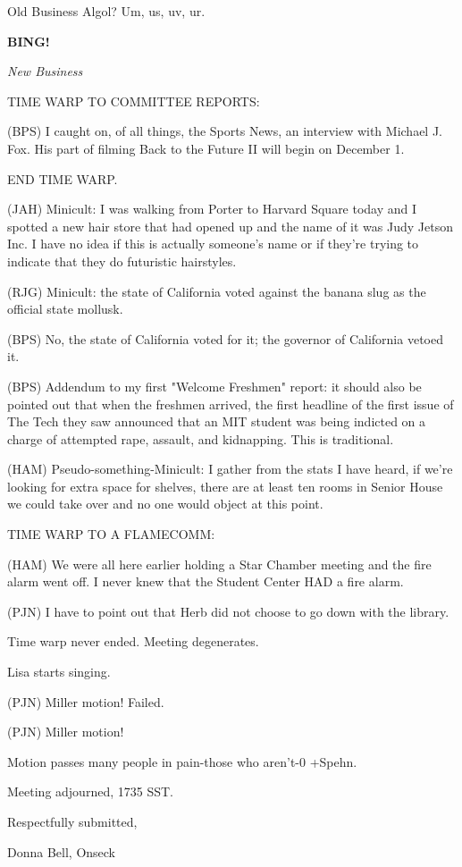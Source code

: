 \documentclass[12pt]{article}
\newcommand{\bing}{{\bf BING!} }
\newcommand{\goto}[1]{\bing \vskip 12pt \centerline{{\em{#1}}}}
\begin{document}
Old Business Algol? Um, us, uv, ur.

\goto{New Business}

TIME WARP TO COMMITTEE REPORTS:

(BPS) I caught on, of all things, the Sports News, an interview with Michael J. Fox. His part of filming Back to the Future II will begin on December 1.

END TIME WARP.

(JAH) Minicult: I was walking from Porter to Harvard Square today and I spotted a new hair store that had opened up and the name of it was Judy Jetson Inc. I have no idea if this is actually someone's name or if they're trying to indicate that they do futuristic hairstyles.

(RJG) Minicult: the state of California voted against the banana slug as the official state mollusk.

(BPS) No, the state of California voted for it; the governor of California vetoed it.

(BPS) Addendum to my first "Welcome Freshmen" report: it should also be pointed out that when the freshmen arrived, the first headline of the first issue of The Tech they saw announced that an MIT student was being indicted on a charge of attempted rape, assault, and kidnapping. This is traditional.

(HAM) Pseudo-something-Minicult: I gather from the stats I have heard, if we're looking for extra space for shelves, there are at least ten rooms in Senior House we could take over and no one would object at this point.

TIME WARP TO A FLAMECOMM:

(HAM) We were all here earlier holding a Star Chamber meeting and the fire alarm went off. I never knew that the Student Center HAD a fire alarm.

(PJN) I have to point out that Herb did not choose to go down with the library.

Time warp never ended. Meeting degenerates.

Lisa starts singing.

(PJN) Miller motion! Failed.

(PJN) Miller motion!

Motion passes many people in pain-those who aren't-0 +Spehn.

\vspace{12pt}

\noindent
Meeting adjourned, 1735 SST.

\vspace{18pt}

\centerline{Respectfully submitted,}
\centerline{Donna Bell, Onseck}
\end{document}
